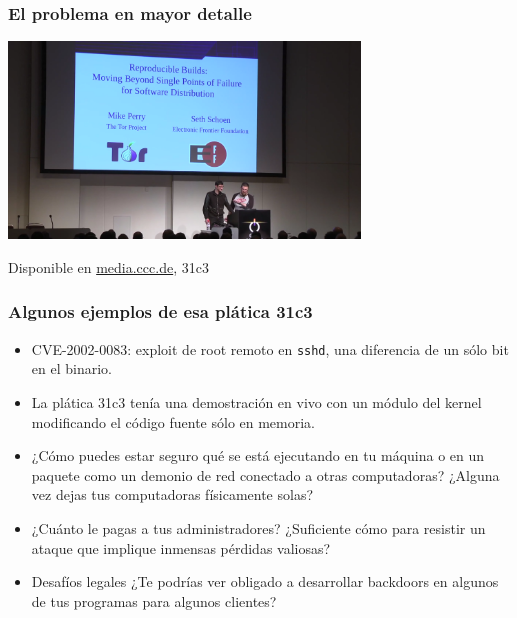 \documentclass[14pt,aspectratio=169]{beamer}
\begin{document}
\begin{frame}
 \frametitle{El problema en mayor detalle}

 \begin{center}
  \includegraphics[width=0.7\textwidth]{images/31c3.png}

  Disponible en \url{media.ccc.de}, 31c3
 \end{center}
\end{frame}

\begin{frame}[fragile]
 \frametitle{Algunos ejemplos de esa plática 31c3}
 \begin{itemize}
  \item CVE-2002-0083: exploit de root remoto en \texttt{sshd}, una diferencia de un sólo bit en el binario.
  \item<2-5> La plática 31c3 tenía una demostración en vivo con un módulo del kernel modificando el código fuente sólo en memoria.
  \item<3-5> ¿Cómo puedes estar seguro qué se está ejecutando en tu máquina o en 
  un paquete como un demonio de red conectado a otras computadoras? ¿Alguna vez 
  dejas tus computadoras físicamente solas? 
  \item<4-5> ¿Cuánto le pagas a tus administradores? ¿Suficiente cómo para resistir un ataque que implique      inmensas pérdidas valiosas?
  \item<5> Desafíos legales ¿Te podrías ver obligado a desarrollar backdoors en algunos de tus
  programas para algunos clientes?
 \end{itemize}
\end{frame}
\end{document}
